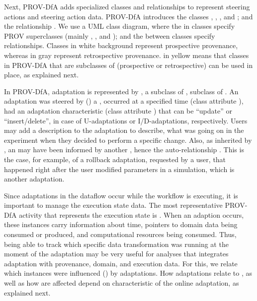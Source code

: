 Next, PROV-DfA adds specialized classes and relationships to represent steering actions
and steering action data.
PROV-DfA introduces the classes ,
,
,
and
;
and the relationship
.
We use a UML class diagram, where the  in classes specify
PROV superclasses (mainly , , and ); and the
 between classes specify relationships.
Classes in white background represent prospective provenance, whereas in gray
represent retrospective provenance.  in yellow means that classes
in PROV-DfA that are subclasses of  (prospective or retrospective)
can be used in place, as explained next.


In PROV-DfA, adaptation is represented by , a subclass of
, subclass of .
An adaptation was steered by
() a ,
occurred at a specified time (class attribute ),
had an adaptation characteristic (class attribute ) that can be
``update'' or ``insert/delete'', in case of U-adaptations or I/D-adaptations,
respectively.
Users may add a description to the adaptation to describe, \eg{} what was going
on in the experiment when they decided to perform a specific change.
Also, as inherited by , an  may have been
informed by another , hence the auto-relationship .
This is the case, for example, of a rollback adaptation, requested by a user,
that happened right after the user modified parameters in a simulation,
which is another adaptation.

Since adaptations in the dataflow occur while the workflow is executing,
it is important to manage the execution state data.
The most representative PROV-DfA activity that represents the execution state is .
When an adaption occurs, these instances carry information about time,
pointers to domain data being consumed or produced,
and computational resources being consumed.
Thus, being able to track which specific data transformation was running
at the moment of the adaptation may be very useful for analyses that integrates
adaptation with provenance, domain, and execution data.
For this, we relate which  instances were influenced
() by adaptations.
How adaptations relate to , as well as how
 are affected depend on characteristic of the online adaptation,
as explained next.

